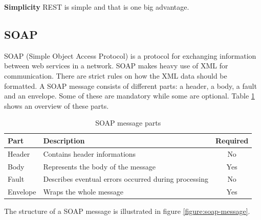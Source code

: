 \textbf{Simplicity}\newline
REST is simple and that is one big advantage.

\subsection{SOAP}\cite{SOAP}
\label{subsec:soap}
SOAP (Simple Object Access Protocol) is a protocol for exchanging information between web services in a network.
SOAP makes heavy use of XML for communication. There are strict rules on how the XML data should be formatted.
A SOAP message consists of different parts: a header, a body, a fault and an envelope. Some of these
are mandatory while some are optional. Table \ref{table:soap-message} shows an overview of these parts.

\begin{table}[h]
\begin{center}
\begin{tabular}{ | l | l | c | }
  \hline
  Part  & Description & Required \\
  \hline\noalign{\smallskip}\hline
  Header & Contains header informations & No \\
  Body   & Represents the body of the message   & Yes \\
  Fault  & Describes eventual errors occurred during processing  & No \\
  Envelope & Wraps the whole message & Yes \\
  \hline
\end{tabular}
\end{center}
\caption{SOAP message parts}
\label{table:soap-message}
\end{table}

The structure of a SOAP message is illustrated in figure \ref{figure:soap-message}.

